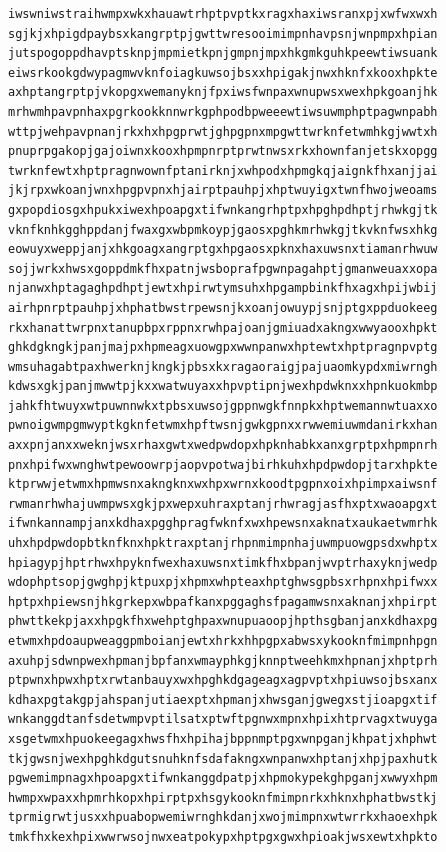 \documentclass[11pt,letterpaper]{exam}
\begin{document}
\begin{questions}
\begin{verbatim}
iwswniwstraihwmpxwkxhauawtrhptpvptkxragxhaxiwsranxpjxwfwxwxh
sgjkjxhpigdpaybsxkangrptpjgwttwresooimimpnhavpsnjwnpmpxhpian
jutspogoppdhavptsknpjmpmietkpnjgmpnjmpxhkgmkguhkpeewtiwsuank
eiwsrkookgdwypagmwvknfoiagkuwsojbsxxhpigakjnwxhknfxkooxhpkte
axhptangrptpjvkopgxwemanyknjfpxiwsfwnpaxwnupwsxwexhpkgoanjhk
mrhwmhpavpnhaxpgrkookknnwrkgphpodbpweeewtiwsuwmphptpagwnpabh
wttpjwehpavpnanjrkxhxhpgprwtjghpgpnxmpgwttwrknfetwmhkgjwwtxh
pnuprpgakopjgajoiwnxkooxhpmpnrptprwtnwsxrkxhownfanjetskxopgg
twrknfewtxhptpragnwownfptanirknjxwhpodxhpmgkqjaignkfhxanjjai
jkjrpxwkoanjwnxhpgpvpnxhjairptpauhpjxhptwuyigxtwnfhwojweoams
gxpopdiosgxhpukxiwexhpoapgxtifwnkangrhptpxhpghpdhptjrhwkgjtk
vknfknhkgghppdanjfwaxgxwbpmkoypjgaosxpghkmrhwkgjtkvknfwsxhkg
eowuyxweppjanjxhkgoagxangrptgxhpgaosxpknxhaxuwsnxtiamanrhwuw
sojjwrkxhwsxgoppdmkfhxpatnjwsboprafpgwnpagahptjgmanweuaxxopa
njanwxhptagaghpdhptjewtxhpirwtymsuhxhpgampbinkfhxagxhpijwbij
airhpnrptpauhpjxhphatbwstrpewsnjkxoanjowuypjsnjptgxppduokeeg
rkxhanattwrpnxtanupbpxrppnxrwhpajoanjgmiuadxakngxwwyaooxhpkt
ghkdgkngkjpanjmajpxhpmeagxuowgpxwwnpanwxhptewtxhptpragnpvptg
wmsuhagabtpaxhwerknjkngkjpbsxkxragaoraigjpajuaomkypdxmiwrngh
kdwsxgkjpanjmwwtpjkxxwatwuyaxxhpvptipnjwexhpdwknxxhpnkuokmbp
jahkfhtwuyxwtpuwnnwkxtpbsxuwsojgppnwgkfnnpkxhptwemannwtuaxxo
pwnoigwmpgmwyptkgknfetwmxhpftwsnjgwkgpnxxrwwemiuwmdanirkxhan
axxpnjanxxweknjwsxrhaxgwtxwedpwdopxhpknhabkxanxgrptpxhpmpnrh
pnxhpifwxwnghwtpewoowrpjaopvpotwajbirhkuhxhpdpwdopjtarxhpkte
ktprwwjetwmxhpmwsnxakngknxwxhpxwrnxkoodtpgpnxoixhpimpxaiwsnf
rwmanrhwhajuwmpwsxgkjpxwepxuhraxptanjrhwragjasfhxptxwaoapgxt
ifwnkannampjanxkdhaxpgghpragfwknfxwxhpewsnxaknatxaukaetwmrhk
uhxhpdpwdopbtknfknxhpktraxptanjrhpnmimpnhajuwmpuowgpsdxwhptx
hpiagypjhptrhwxhpyknfwexhaxuwsnxtimkfhxbpanjwvptrhaxyknjwedp
wdophptsopjgwghpjktpuxpjxhpmxwhpteaxhptghwsgpbsxrhpnxhpifwxx
hptpxhpiewsnjhkgrkepxwbpafkanxpggaghsfpagamwsnxaknanjxhpirpt
phwttkekpjaxxhpgkfhxwehptghpaxwnupuaoopjhpthsgbanjanxkdhaxpg
etwmxhpdoaupweaggpmboianjewtxhrkxhhpgpxabwsxykooknfmimpnhpgn
axuhpjsdwnpwexhpmanjbpfanxwmayphkgjknnptweehkmxhpnanjxhptprh
ptpwnxhpwxhptxrwtanbauyxwxhpghkdgageagxagpvptxhpiuwsojbsxanx
kdhaxpgtakgpjahspanjutiaexptxhpmanjxhwsganjgwegxstjioapgxtif
wnkanggdtanfsdetwmpvptilsatxptwftpgnwxmpnxhpixhtprvagxtwuyga
xsgetwmxhpuokeegagxhwsfhxhpihajbppnmptpgxwnpganjkhpatjxhphwt
tkjgwsnjwexhpghkdgutsnuhknfsdafakngxwnpanwxhptanjxhpjpaxhutk
pgwemimpnagxhpoapgxtifwnkanggdpatpjxhpmokypekghpganjxwwyxhpm
hwmpxwpaxxhpmrhkopxhpirptpxhsgykooknfmimpnrkxhknxhphatbwstkj
tprmigrwtjusxxhpuabopwemiwrnghkdanjxwojmimpnxwtwrrkxhaoexhpk
tmkfhxkexhpixwwrwsojnwxeatpokypxhptpgxgwxhpioakjwsxewtxhpkto

\end{verbatim}
\end{questions}
\end{document}
